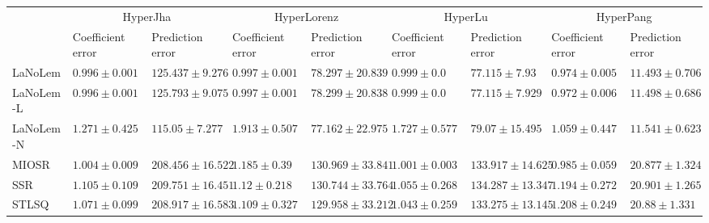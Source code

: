 \begin{table*}
{\begin{tabular}{lllllllll}
 & \multicolumn{2}{c}{HyperJha} & \multicolumn{2}{c}{HyperLorenz} & \multicolumn{2}{c}{HyperLu} & \multicolumn{2}{c}{HyperPang} \\
 & Coefficient error & Prediction error & Coefficient error & Prediction error & Coefficient error & Prediction error & Coefficient error & Prediction error \\
\midrule
LaNoLem & $0.996\pm 0.001$ & $125.437\pm 9.276$ & $\mathbf{0.997}\pm 0.001$ & $78.297\pm 20.839$ & $\mathbf{0.999}\pm 0.0$ & $\mathbf{77.115}\pm 7.93$ & $0.974\pm 0.005$ & $\mathbf{11.493}\pm 0.706$ \\
LaNoLem-L & $\mathbf{0.996}\pm 0.001$ & $125.793\pm 9.075$ & $0.997\pm 0.001$ & $78.299\pm 20.838$ & $0.999\pm 0.0$ & $77.115\pm 7.929$ & $\mathbf{0.972}\pm 0.006$ & $11.498\pm 0.686$ \\
LaNoLem-N & $1.271\pm 0.425$ & $\mathbf{115.05}\pm 7.277$ & $1.913\pm 0.507$ & $\mathbf{77.162}\pm 22.975$ & $1.727\pm 0.577$ & $79.07\pm 15.495$ & $1.059\pm 0.447$ & $11.541\pm 0.623$ \\
MIOSR & $1.004\pm 0.009$ & $208.456\pm 16.522$ & $1.185\pm 0.39$ & $130.969\pm 33.841$ & $1.001\pm 0.003$ & $133.917\pm 14.625$ & $0.985\pm 0.059$ & $20.877\pm 1.324$ \\
SSR & $1.105\pm 0.109$ & $209.751\pm 16.451$ & $1.12\pm 0.218$ & $130.744\pm 33.764$ & $1.055\pm 0.268$ & $134.287\pm 13.347$ & $1.194\pm 0.272$ & $20.901\pm 1.265$ \\
STLSQ & $1.071\pm 0.099$ & $208.917\pm 16.583$ & $1.109\pm 0.327$ & $129.958\pm 33.212$ & $1.043\pm 0.259$ & $133.275\pm 13.145$ & $1.208\pm 0.249$ & $20.88\pm 1.331$ \\

\midrule


\end{tabular}}
\end{table*}

